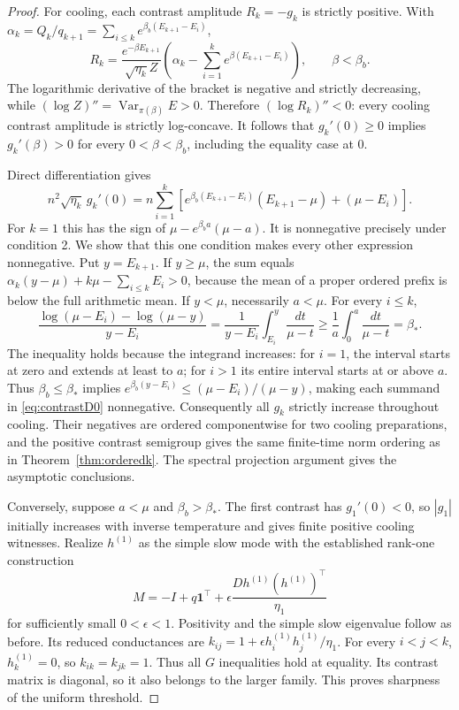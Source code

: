 \documentclass[11pt]{article}
\begin{document}
\begin{proof}
For cooling, each contrast amplitude $R_k=-g_k$ is strictly positive.
With $\alpha_k=Q_k/q_{k+1}=\sum_{i\leq k}e^{\beta_b(E_{k+1}-E_i)}$,
\[
R_k=\frac{e^{-\beta E_{k+1}}}
{\sqrt{\eta_k}Z}\left(\alpha_k-
\sum_{i=1}^ke^{\beta(E_{k+1}-E_i)}\right),\qquad \beta<\beta_b.
\]
The logarithmic derivative of the bracket is negative and strictly
decreasing, while $(\log Z)''=\operatorname{Var}_{\pi(\beta)}E>0$.
Therefore $(\log R_k)''<0$: every cooling contrast amplitude is strictly
log-concave. It follows that $g_k'(0)\geq0$ implies $g_k'(\beta)>0$ for
every $0<\beta<\beta_b$, including the equality case at $0$.

Direct differentiation gives
\begin{equation}\label{eq:contrastD0}
n^2\sqrt{\eta_k}\,g_k'(0)=
n\sum_{i=1}^k\left[
e^{\beta_b(E_{k+1}-E_i)}(E_{k+1}-\mu)+(\mu-E_i)\right].
\end{equation}
For $k=1$ this has the sign of
$\mu-e^{\beta_ba}(\mu-a)$. It is nonnegative precisely under condition 2.
We show that this one condition makes every other expression nonnegative.
Put $y=E_{k+1}$. If $y\geq\mu$, the sum equals
$\alpha_k(y-\mu)+k\mu-\sum_{i\leq k}E_i>0$, because the mean of a proper
ordered prefix is below the full arithmetic mean.
If $y<\mu$, necessarily $a<\mu$. For every $i\leq k$,
\[
\frac{\log(\mu-E_i)-\log(\mu-y)}{y-E_i}
=\frac1{y-E_i}\int_{E_i}^{y}\frac{dt}{\mu-t}
\geq\frac1a\int_0^a\frac{dt}{\mu-t}=\beta_*.
\]
The inequality holds because the integrand increases: for $i=1$, the
interval starts at zero and extends at least to $a$; for $i>1$ its entire
interval starts at or above $a$. Thus $\beta_b\leq\beta_*$ implies
$e^{\beta_b(y-E_i)}\leq(\mu-E_i)/(\mu-y)$, making each summand in
\eqref{eq:contrastD0} nonnegative. Consequently all $g_k$ strictly increase
throughout cooling. Their negatives are ordered componentwise for two
cooling preparations, and the positive contrast semigroup gives the same
finite-time norm ordering as in Theorem~\ref{thm:orderedk}. The spectral
projection argument gives the asymptotic conclusions.

Conversely, suppose $a<\mu$ and $\beta_b>\beta_*$. The first contrast has
$g_1'(0)<0$, so $|g_1|$ initially increases with inverse temperature and
gives finite positive cooling witnesses. Realize $h^{(1)}$ as the simple
slow mode with the established rank-one construction
\[
M=-I+q\mathbf1^\top+\epsilon
\frac{D h^{(1)}(h^{(1)})^\top}{\eta_1}
\]
for sufficiently small $0<\epsilon<1$. Positivity and the simple slow
eigenvalue follow as before. Its reduced conductances are
$k_{ij}=1+\epsilon h_i^{(1)}h_j^{(1)}/\eta_1$. For every $i<j<k$,
$h_k^{(1)}=0$, so $k_{ik}=k_{jk}=1$. Thus all $G$ inequalities hold
at equality. Its contrast matrix is diagonal, so it also belongs to the
larger family. This proves sharpness of the uniform threshold.
\end{proof}
\end{document}
